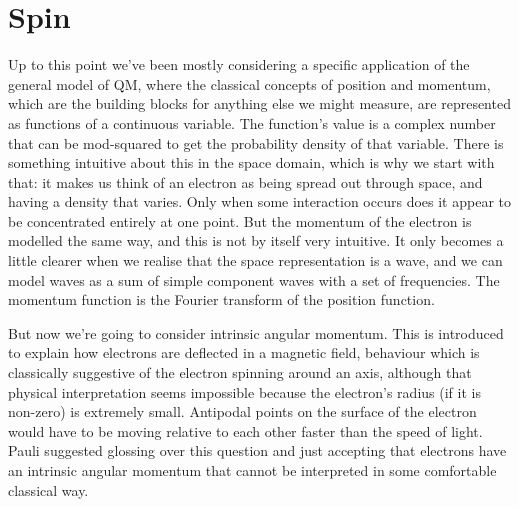 \section{Spin}

Up to this point we've been mostly considering a specific application of the general model of QM, where the classical concepts of position and momentum, which are the building blocks for anything else we might measure, are represented as functions of a continuous variable. The function's value is a complex number that can be mod-squared to get the probability density of that variable. There is something intuitive about this in the space domain, which is why we start with that: it makes us think of an electron as being spread out through space, and having a density that varies. Only when some interaction occurs does it appear to be concentrated entirely at one point. But the momentum of the electron is modelled the same way, and this is not by itself very intuitive. It only becomes a little clearer when we realise that the space representation is a wave, and we can model waves as a sum of simple component waves with a set of frequencies. The momentum function is the Fourier transform of the position function.

But now we're going to consider intrinsic angular momentum. This is introduced to explain how electrons are deflected in a magnetic field, behaviour which is classically suggestive of the electron spinning around an axis, although that physical interpretation seems impossible because the electron's radius (if it is non-zero) is extremely small. Antipodal points on the surface of the electron would have to be moving relative to each other faster than the speed of light. Pauli suggested glossing over this question and just accepting that electrons have an intrinsic angular momentum that cannot be interpreted in some comfortable classical way.

